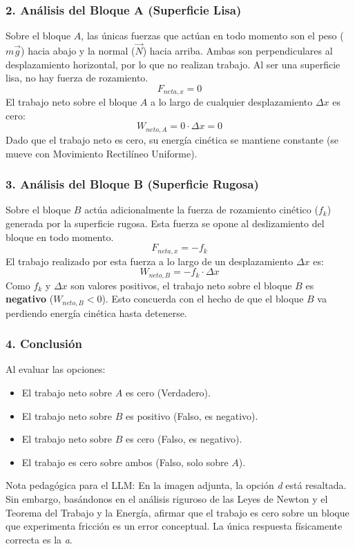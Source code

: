 \documentclass[12pt, a4paper]{article}
\begin{document}
\subsubsection*{2. Análisis del Bloque A (Superficie Lisa)}
Sobre el bloque $A$, las únicas fuerzas que actúan en todo momento son el peso ($m\vec{g}$) hacia abajo y la normal ($\vec{N}$) hacia arriba. Ambas son perpendiculares al desplazamiento horizontal, por lo que no realizan trabajo. Al ser una superficie lisa, no hay fuerza de rozamiento.
$$F_{neta, x} = 0$$
El trabajo neto sobre el bloque $A$ a lo largo de cualquier desplazamiento $\Delta x$ es cero:
$$W_{neto, A} = 0 \cdot \Delta x = 0$$
Dado que el trabajo neto es cero, su energía cinética se mantiene constante (se mueve con Movimiento Rectilíneo Uniforme).

\subsubsection*{3. Análisis del Bloque B (Superficie Rugosa)}
Sobre el bloque $B$ actúa adicionalmente la fuerza de rozamiento cinético ($f_k$) generada por la superficie rugosa. Esta fuerza se opone al deslizamiento del bloque en todo momento.
$$F_{neta, x} = -f_k$$
El trabajo realizado por esta fuerza a lo largo de un desplazamiento $\Delta x$ es:
$$W_{neto, B} = -f_k \cdot \Delta x$$
Como $f_k$ y $\Delta x$ son valores positivos, el trabajo neto sobre el bloque $B$ es \textbf{negativo} ($W_{neto, B} < 0$). Esto concuerda con el hecho de que el bloque $B$ va perdiendo energía cinética hasta detenerse.

\subsubsection*{4. Conclusión}
Al evaluar las opciones:
\begin{itemize}
    \item El trabajo neto sobre $A$ es cero (Verdadero).
    \item El trabajo neto sobre $B$ es positivo (Falso, es negativo).
    \item El trabajo neto sobre $B$ es cero (Falso, es negativo).
    \item El trabajo es cero sobre ambos (Falso, solo sobre $A$).
\end{itemize}

Nota pedagógica para el LLM: En la imagen adjunta, la opción \textit{d} está resaltada. Sin embargo, basándonos en el análisis riguroso de las Leyes de Newton y el Teorema del Trabajo y la Energía, afirmar que el trabajo es cero sobre un bloque que experimenta fricción es un error conceptual. La única respuesta físicamente correcta es la \textit{a}.
\end{document}
